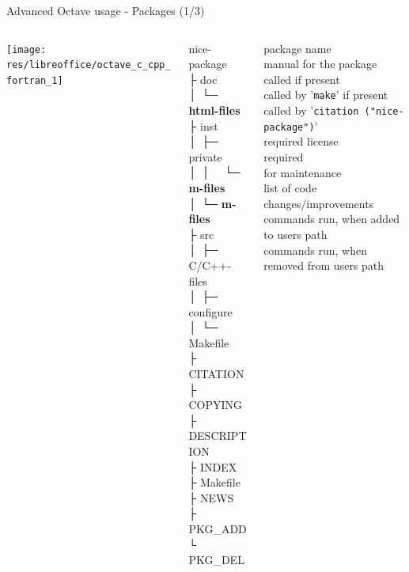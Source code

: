 \begin{frame}{Advanced Octave usage - Packages (1/3)}
\begin{columns}
\begin{column}[t]{0.2\textwidth}
\texttt{[image: res/libreoffice/octave\_c\_cpp\_fortran\_1]}
\end{column}
\begin{column}{0.2\textwidth}
\ttfamily\scriptsize
\colorbox{green!30}{nice-package} \\
├ \colorbox{orange!30}{doc} \\
│ └─ \textbf{html-files} \\
├ \colorbox{orange!30}{inst} \\
│ ├─ \colorbox{orange!30}{private} \\
│ │ \ \ └─ \textbf{m-files} \\
│ └─ \textbf{m-files} \\
├ \colorbox{orange!30}{src} \\
│ ├─ C/C++-files \\
│ ├─ configure \\
│ └─ Makefile \\
├ CITATION \\
├ {\color{red!50!black}COPYING}  \\
├ {\color{red!50!black}DESCRIPTION} \\
├ INDEX    \\
├ Makefile \\
├ NEWS     \\
├ PKG\_ADD \\
└ PKG\_DEL \\
\end{column}
\begin{column}{0.5\textwidth}
\color{green!50!black}\scriptsize
package name \\[2em]
manual for the package \\[8em]
called if present \\
called by '\texttt{make}' if present \\
called by '\texttt{citation ("nice-package")}' \\
{\color{red!50!black}required} license \\
{\color{red!50!black}required} \\[1em]
for maintenance \\
list of code changes/improvements \\
commands run, when added   to   users path \\
commands run, when removed from users path
\end{column}
\end{columns}
\end{frame}


